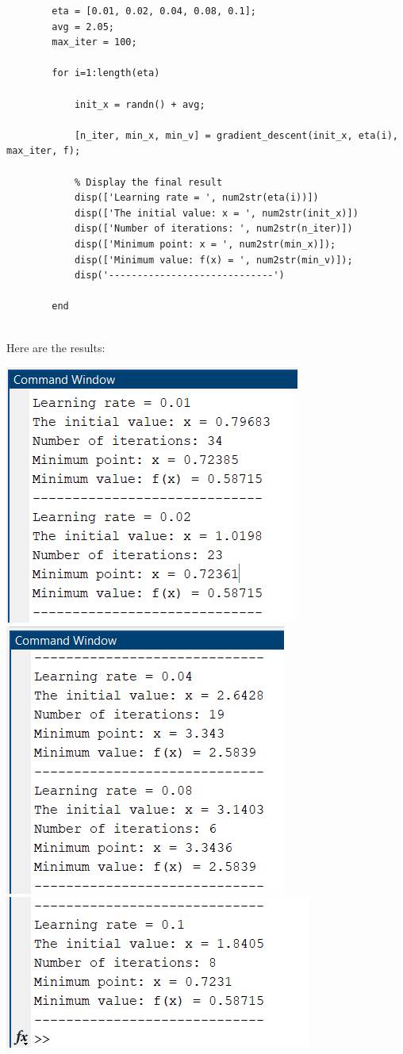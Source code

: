 \documentclass[]{article}
\begin{document}
	\begin{lstlisting}
		eta = [0.01, 0.02, 0.04, 0.08, 0.1];
		avg = 2.05;
		max_iter = 100;
		
		for i=1:length(eta)
		
			init_x = randn() + avg;
			
			[n_iter, min_x, min_v] = gradient_descent(init_x, eta(i), max_iter, f);
			
			% Display the final result
			disp(['Learning rate = ', num2str(eta(i))])
			disp(['The initial value: x = ', num2str(init_x)])
			disp(['Number of iterations: ', num2str(n_iter)])
			disp(['Minimum point: x = ', num2str(min_x)]);
			disp(['Minimum value: f(x) = ', num2str(min_v)]);
			disp('-----------------------------')
		
		end
		
	\end{lstlisting}
	Here are the results:
	\begin{center}
		\includegraphics[width=0.25\linewidth]{Fig/F7.png}
		\qquad
		\includegraphics[width=0.23\linewidth]{Fig/F8.png}
		\qquad
		\includegraphics[width=0.25\linewidth]{Fig/F9.png}
	\end{center}
	
\end{document}
